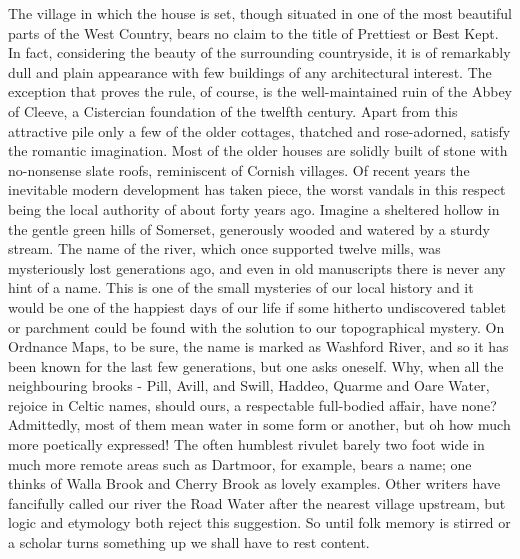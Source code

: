 The village in which the house is set, though situated in one of the most beautiful parts of the West Country, bears no claim to the title of Prettiest or Best Kept. In fact, considering the beauty of the surrounding countryside, it is of remarkably dull and plain appearance with few buildings of any architectural interest. The exception that proves the rule, of course, is the well-maintained ruin of the Abbey of Cleeve, a Cistercian foundation of the twelfth century. Apart from this attractive pile only a few of the older cottages, thatched and rose-adorned, satisfy the romantic imagination. Most of the older houses are solidly built of stone with no-nonsense slate roofs, reminiscent of Cornish villages. Of recent years the inevitable modern development has taken piece, the worst vandals in this respect being the local authority of about forty years ago. Imagine a sheltered hollow in the gentle green hills of Somerset, generously wooded and watered by a sturdy stream. The name of the river, which once supported twelve mills, was mysteriously lost generations ago, and even in old manuscripts there is never any hint of a name. This is one of the small mysteries of our local history and it would be one of the happiest days of our life if some hitherto undiscovered tablet or parchment could be found with the solution to our topographical mystery. On Ordnance Maps, to be sure, the name is marked as Washford River, and so it has been known for the last few generations, but   one asks oneself. Why, when all the neighbouring brooks - Pill, Avill, and Swill, Haddeo, Quarme and Oare Water, rejoice in Celtic names, should ours, a respectable full-bodied affair, have none? Admittedly, most of them mean water in some form or another, but oh how much more poetically expressed! The often humblest rivulet barely two foot wide in much more remote areas such as Dartmoor, for example, bears a name; one thinks of Walla Brook and Cherry Brook as lovely examples. Other writers have fancifully called our river the Road Water after the nearest village upstream, but logic and etymology both reject this suggestion. So until folk memory is stirred or a scholar turns something up we shall have to rest content.

